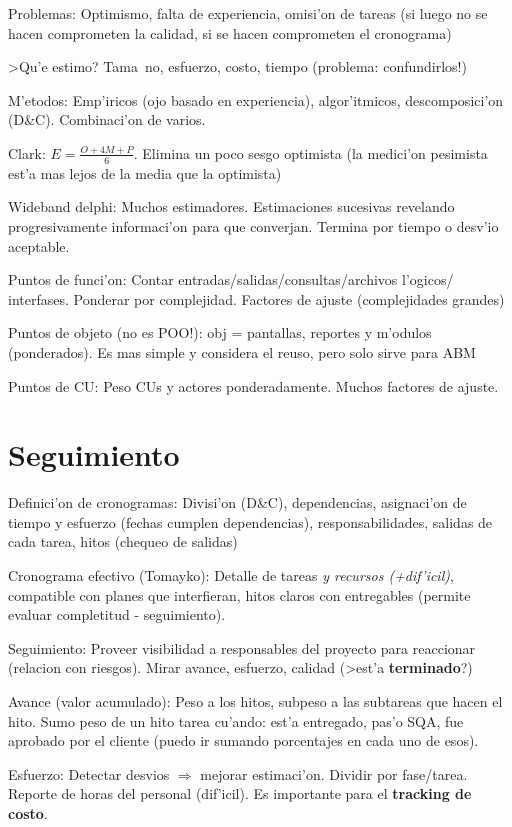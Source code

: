 \documentclass[a4paper,spanish]{article}
\begin{document}
Problemas: Optimismo, falta de experiencia, omisi'on de tareas (si luego no se
	hacen comprometen la calidad, si se hacen comprometen el cronograma)

>Qu'e estimo? Tama~no, esfuerzo, costo, tiempo (problema: confundirlos!)

M'etodos: Emp'iricos (ojo basado en experiencia), algor'itmicos, 
	descomposici'on (D\&C). Combinaci'on de varios.
	
Clark: $E = \frac{O + 4M + P}{6}$. Elimina un poco sesgo optimista (la 
	medici'on pesimista est'a mas lejos de la media que la optimista)

Wideband delphi: Muchos estimadores. Estimaciones sucesivas revelando 
	progresivamente informaci'on para que converjan. Termina por tiempo o 
	desv'io aceptable.

Puntos de funci'on: Contar entradas/salidas/consultas/archivos l'ogicos/
	interfases. Ponderar por complejidad. Factores de ajuste (complejidades
	grandes)
	
Puntos de objeto (no es POO!): obj = pantallas, reportes y m'odulos 
	(ponderados). Es mas simple y considera el reuso, pero solo sirve para ABM
	
Puntos de CU: Peso CUs y actores ponderadamente. Muchos factores de ajuste.

\section{Seguimiento}

Definici'on de cronogramas: Divisi'on (D\&C), dependencias, asignaci'on de
	tiempo y esfuerzo (fechas cumplen dependencias), responsabilidades, 
	salidas de cada tarea, hitos (chequeo de salidas)

Cronograma efectivo (Tomayko): Detalle de tareas \emph{y recursos (+dif'icil)},
	compatible con planes que interfieran, hitos claros con entregables 
	(permite evaluar completitud - seguimiento).

Seguimiento: Proveer visibilidad a responsables del proyecto para reaccionar
	 (relacion con riesgos). Mirar avance, esfuerzo, calidad (>est'a 
	 \textbf{terminado}?)
	
Avance (valor acumulado): Peso a los hitos, subpeso a las subtareas que hacen
	el hito. Sumo peso de un hito tarea cu'ando: est'a entregado, pas'o SQA,
	fue aprobado por el cliente (puedo ir sumando porcentajes en cada uno de
	esos).
	
Esfuerzo: Detectar desvios $\Rightarrow$ mejorar estimaci'on. Dividir por 
	fase/tarea. Reporte de horas del personal (dif'icil). Es importante para
	el \textbf{tracking de costo}.
\end{document}
